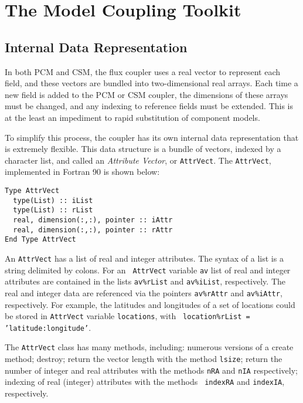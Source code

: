 \documentclass{article}
\begin{document}
\section{The Model Coupling Toolkit}\label{sec-mct}

\subsection{Internal Data Representation}\label{sec-mct-base}

In both PCM and CSM, the flux coupler uses a real vector to
represent each field, and these vectors are bundled into
two-dimensional real arrays.  Each time a new field is added to
the PCM or CSM coupler, the dimensions of these arrays must be
changed, and any indexing to reference fields must be extended.
This is at the least an impediment to rapid substitution of
component models.

To simplify this process, the coupler has its own internal data
representation that is extremely flexible.  This data structure
is a bundle of vectors, indexed by a character list, and called an
{\em Attribute Vector}, or {\tt AttrVect}.  The {\tt AttrVect},
implemented in Fortran 90 is shown below:

\begin{verbatim}
Type AttrVect
  type(List) :: iList
  type(List) :: rList
  real, dimension(:,:), pointer :: iAttr
  real, dimension(:,:), pointer :: rAttr
End Type AttrVect
\end{verbatim}

An {\tt AttrVect} has a list of real and integer attributes. The
syntax of a list is a string delimited by colons.  For an {\tt
AttrVect} variable {\tt av} list of real and integer attributes
are contained in the lists {\tt av\%rList} and {\tt av\%iList},
respectively.  The real and integer data are referenced via the
pointers {\tt av\%rAttr} and {\tt av\%iAttr}, respectively. For
example, the latitudes and longitudes of a set of locations could
be stored in {\tt AttrVect} variable {\tt locations}, with {\tt
location\%rList = 'latitude:longitude'}.

The {\tt AttrVect} class has many methods, including:  numerous
versions of a create method; destroy; return the vector length
with the method {\tt lsize}; return the number of integer and real
attributes with the methods {\tt nRA} and {\tt nIA} respectively;
indexing of real (integer) attributes with the methods {\tt
indexRA} and {\tt indexIA}, respectively.
\end{document}
